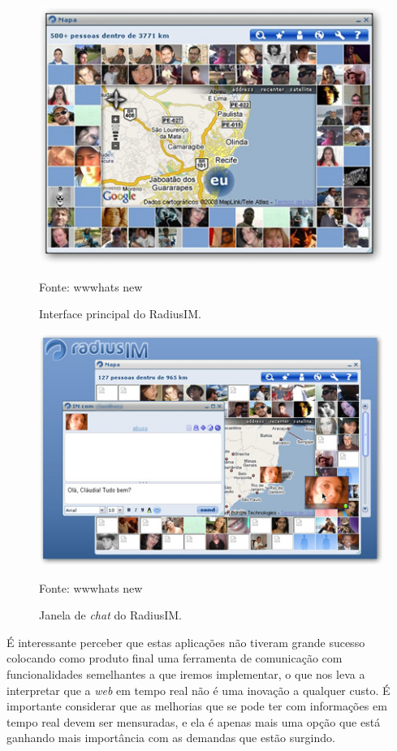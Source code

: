 \begin{figure}[H]
	\centering
	\includegraphics[scale=0.9]{imagens/radiusim.jpg}
	\caption{\small Interface principal do RadiusIM.} Fonte: wwwhats new \cite{radiusim}
	\label{fig:radiusim-principal}
\end{figure}

\begin{figure}[H]
	\centering
	\includegraphics[scale=0.9]{imagens/radiusim2.jpg}
	\caption{\small Janela de \textit{chat} do RadiusIM.} Fonte: wwwhats new \cite{radiusim}
	\label{fig:radiusim-chat}
\end{figure}

É interessante perceber que estas aplicações não tiveram grande sucesso colocando como produto final uma ferramenta de comunicação com funcionalidades semelhantes a que iremos implementar, o que nos leva a interpretar que a \textit{web} em tempo real não é uma inovação a qualquer custo. É importante considerar que as melhorias que se pode ter com informações em tempo real devem ser mensuradas, e ela é apenas mais uma opção que está ganhando mais importância com as demandas que estão surgindo.

